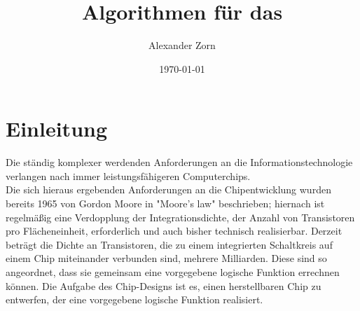 \documentclass[11pt, a4paper, german]{article}
\author{Alexander Zorn}
\date{\today}
\title{Algorithmen f\"ur das \TM}
\begin{document}
\setlength{\parindent}{0pt} %
\maketitle

\tableofcontents
\newpage 
\section{Einleitung}
\label{sec:einleitung}
Die ständig komplexer werdenden Anforderungen an die Informationstechnologie verlangen nach immer leistungsfähigeren Computerchips. \\
Die sich hieraus ergebenden Anforderungen an die Chipentwicklung wurden bereits 1965 von Gordon Moore in "Moore's law"  \cite{Moore} beschrieben; hiernach ist regelmäßig eine Verdopplung der Integrationsdichte, der Anzahl von Transistoren pro Flächeneinheit, erforderlich und auch bisher technisch realisierbar. Derzeit beträgt die Dichte an Transistoren, die zu einem integrierten Schaltkreis auf einem Chip miteinander verbunden sind, mehrere Milliarden. Diese sind so angeordnet, dass sie gemeinsam eine vorgegebene logische Funktion errechnen können. Die Aufgabe des Chip-Designs ist es, einen herstellbaren Chip zu entwerfen, der eine vorgegebene logische Funktion realisiert.\\
\end{document}
